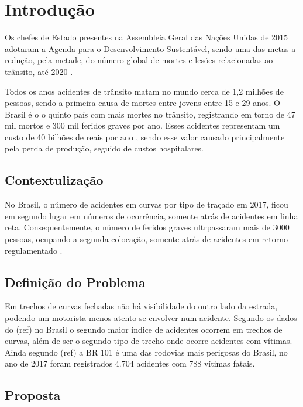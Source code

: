 \chapter{Introdução}

Os chefes de Estado presentes na Assembleia Geral das Nações Unidas de 2015 adotaram a Agenda para o Desenvolvimento Sustentável, sendo uma das metas a redução, pela metade, do número global de mortes e lesões relacionadas ao trânsito, até 2020 \cite{relatorio_oms}.

Todos os anos acidentes de trânsito matam no mundo cerca de 1,2 milhões de pessoas, sendo a primeira causa de mortes entre jovens entre 15 e 29 anos. O Brasil é o o quinto país com mais mortes no trânsito, registrando em torno de 47 mil mortos e 300 mil feridos graves por ano. Esses acidentes representam um custo de 40 bilhões de reais por ano \cite{relatorio_ipea}, sendo esse valor causado principalmente pela perda de produção, seguido de custos hospitalares.

\section{Contextulização}

No Brasil, o número de acidentes em curvas por tipo de traçado em 2017, ficou em segundo lugar em números de ocorrência, somente atrás de acidentes em linha reta. Consequentemente, o número de feridos graves ultrpassaram mais de 3000 pessoas, ocupando a segunda colocação, somente atrás de acidentes em retorno regulamentado \cite{anuario_rodoviario}.


\section{Definição do Problema}

Em trechos de curvas fechadas não há visibilidade do outro lado da estrada, podendo um motorista menos atento se envolver num acidente. Segundo os dados do (ref) no Brasil o segundo maior índice de acidentes ocorrem em trechos de curvas, além de ser o segundo tipo de trecho onde ocorre acidentes com vítimas. Ainda segundo (ref) a BR 101 é uma das rodovias mais perigosas do Brasil, no ano de 2017 foram registrados 4.704 acidentes com 788 vítimas fatais. 

\section{Proposta}

